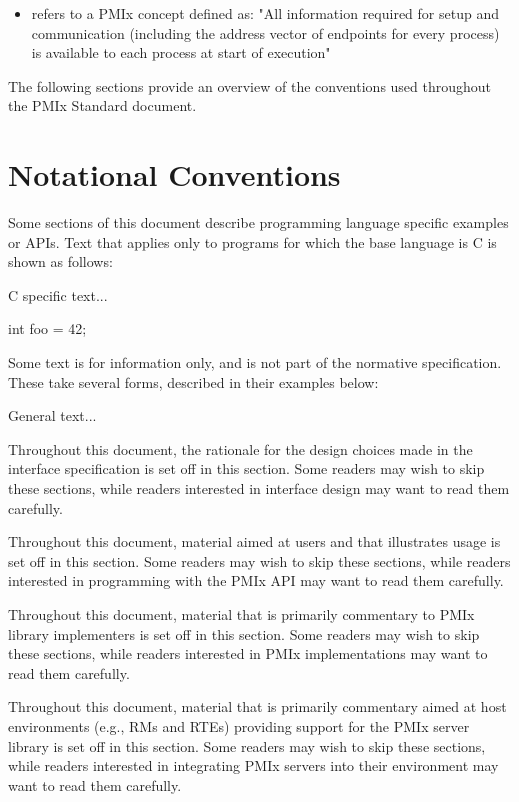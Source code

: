 \begin{itemize}
\item {} refers to a \ac{PMIx} concept defined as: "All information required for setup and communication (including the address vector of endpoints for every process) is available to each process at start of execution"

\end{itemize}


The following sections provide an overview of the conventions used throughout the \ac{PMIx} Standard document.

\section{Notational Conventions}

Some sections of this document describe programming language specific examples or \acp{API}.
Text that applies only to programs for which the base language is C is shown as follows:

\cspecificstart
C specific text...
\begin{codepar}
int foo = 42;
\end{codepar}
\cspecificend

Some text is for information only, and is not part of the normative specification.
These take several forms, described in their examples below:

\notestart
\noteheader
General text...
\noteend

\rationalestart
Throughout this document, the rationale for the design choices made in the interface specification is set off in this section.
Some readers may wish to skip these sections, while readers interested in interface design may want to read them carefully.
\rationaleend

\adviceuserstart
Throughout this document, material aimed at users and that illustrates usage is set off in this section.
Some readers may wish to skip these sections, while readers interested in programming with the \ac{PMIx} \ac{API} may want to read them carefully.
\adviceuserend

\adviceimplstart
Throughout this document, material that is primarily commentary to \ac{PMIx} library implementers is set off in this section.
Some readers may wish to skip these sections, while readers interested in \ac{PMIx} implementations may want to read them carefully.
\adviceimplend

\advicermstart
Throughout this document, material that is primarily commentary aimed at host environments (e.g., \acp{RM} and \acp{RTE}) providing support for the \ac{PMIx} server library is set off in this section.
Some readers may wish to skip these sections, while readers interested in integrating \ac{PMIx} servers into their environment may want to read them carefully.
\advicermend

